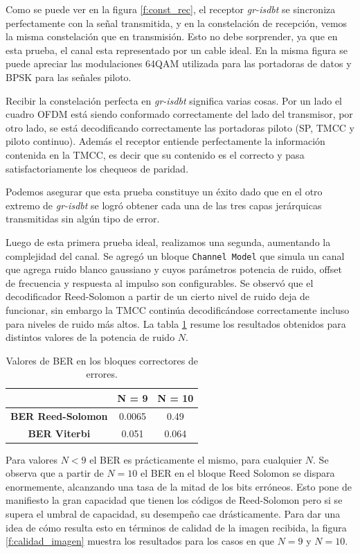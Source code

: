 Como se puede ver en la figura \ref{f:const_rec}, el receptor \textit{gr-isdbt} se sincroniza perfectamente con la señal transmitida, y en la constelación de recepción, vemos la misma constelación que en transmisión. Esto no debe sorprender, ya que en esta prueba, el canal esta representado por un cable ideal. En la misma figura se puede apreciar las modulaciones 64QAM utilizada para las portadoras de datos y BPSK para las señales piloto. 

Recibir la constelación perfecta en \textit{gr-isdbt} significa varias cosas. Por un lado el cuadro OFDM está siendo conformado correctamente del lado del transmisor, por otro lado, se está decodificando correctamente las portadoras piloto (SP, TMCC y piloto continuo). Además el receptor entiende perfectamente la información contenida en la TMCC, es decir que su contenido es el correcto y pasa satisfactoriamente los chequeos de paridad.

Podemos asegurar que esta prueba constituye un éxito dado que en el otro extremo de \textit{gr-isdbt} se logró obtener cada una de las tres capas jerárquicas transmitidas sin algún tipo de error.

Luego de esta primera prueba ideal, realizamos una segunda, aumentando la complejidad del canal. Se agregó un bloque \verb|Channel Model| que simula un canal que agrega ruido blanco gaussiano y cuyos parámetros potencia de ruido, offset de frecuencia y respuesta al impulso son configurables. Se observó que el decodificador Reed-Solomon a partir de un cierto nivel de ruido deja de funcionar, sin embargo la TMCC continúa decodificándose correctamente incluso para niveles de ruido más altos. La tabla \ref{t:resultados_errores} resume los resultados obtenidos para distintos valores de la potencia de ruido $N$.

\begin{table}[h!]
	\centering
	\begin{tabular}{|c|c|c|}
		\hline
			& \textbf{N = 9} & \textbf{N = 10}\\
		\hline
		\textbf{BER Reed-Solomon} & 0.0065 & 0.49\\
		\hline
		\textbf{BER Viterbi}		& 0.051 & 0.064\\
		\hline
	\end{tabular}
	\caption{\label{t:resultados_errores} Valores de BER en los bloques correctores de errores.}
\end{table} 

Para valores $N < 9$ el BER es prácticamente el mismo, para cualquier $N$. Se observa que a partir de $N = 10$ el BER en el bloque Reed Solomon se dispara enormemente, alcanzando una tasa de la mitad de los bits erróneos. Esto pone de manifiesto la gran capacidad que tienen los códigos de Reed-Solomon pero si se supera el umbral de capacidad, su desempeño cae drásticamente. Para dar una idea de cómo resulta esto en términos de calidad de la imagen recibida, la figura \ref{f:calidad_imagen} muestra los resultados para los casos en que $N = 9$ y $N = 10$.

